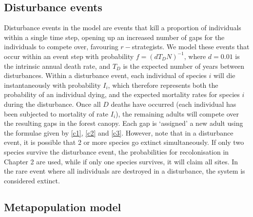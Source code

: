 \subsection{Disturbance events}
Disturbance events in the model are events that kill a proportion of individuals within a single time step, opening up an increased number of gaps for the individuals to compete over, favouring $r-$strategists. We model these events that occur within an event step with probability $f=(dT_DN)^{-1}$, where $d=0.01$ is the intrinsic annual death rate, and $T_D$ is the expected number of years between disturbances. Within a disturbance event, each individual of species $i$ will die instantaneously with probability $I_i$, which therefore represents both the probability of an individual dying, and the expected mortality rates for species $i$ during the disturbance. Once all $D$ deaths have occurred (each individual has been subjected to mortality of rate $I_i$), the remaining adults will compete over the resulting gaps in the forest canopy. Each gap is `assigned' a new adult using the formulae given by \eqref{c1}, \eqref{c2} and \eqref{c3}. However, note that in a disturbance event, it is possible that 2 or more species go extinct simultaneously. If only two species survive the disturbance event, the probabilities for recolonisation in Chapter 2 are used, while if only one species survives, it will claim all sites. In the rare event where all individuals are destroyed in a disturbance, the system is considered extinct. 

\subsection{Metapopulation model}
\label{metapopmodel}

